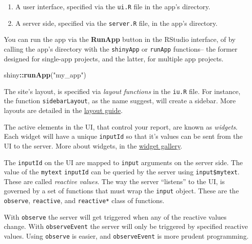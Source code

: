 \documentclass[]{book}
\newenvironment{Shaded}{\begin{snugshade}}{\end{snugshade}}
\newcommand{\KeywordTok}[1]{\textcolor[rgb]{0.13,0.29,0.53}{\textbf{#1}}}
\newcommand{\StringTok}[1]{\textcolor[rgb]{0.31,0.60,0.02}{#1}}
\newcommand{\OperatorTok}[1]{\textcolor[rgb]{0.81,0.36,0.00}{\textbf{#1}}}
\newcommand{\NormalTok}[1]{#1}
\providecommand{\tightlist}{%
  \setlength{\itemsep}{0pt}\setlength{\parskip}{0pt}}
\theoremstyle{definition}
\theoremstyle{definition}
\theoremstyle{definition}
\theoremstyle{remark}
\begin{document}
\begin{enumerate}
\def\labelenumi{\arabic{enumi}.}
\tightlist
\item
  A user interface, specified via the \texttt{ui.R} file in the app's
  directory.
\item
  A server side, specified via the \texttt{server.R} file, in the app's
  directory.
\end{enumerate}

You can run the app via the \textbf{RunApp} button in the RStudio
interface, of by calling the app's directory with the \texttt{shinyApp}
or \texttt{runApp} functions-- the former designed for single-app
projects, and the latter, for multiple app projects.

\begin{Shaded}
\begin{Highlighting}[]
\NormalTok{shiny}\OperatorTok{::}\KeywordTok{runApp}\NormalTok{(}\StringTok{"my_app"}\NormalTok{)}
\end{Highlighting}
\end{Shaded}

The site's layout, is specified via \emph{layout functions} in the
\texttt{iu.R} file. For instance, the function \texttt{sidebarLayout},
as the name suggest, will create a sidebar. More layouts are detailed in
the \href{http://shiny.rstudio.com/articles/layout-guide.html}{layout
guide}.

The active elements in the UI, that control your report, are known as
\emph{widgets}. Each widget will have a unique \texttt{inputId} so that
it's values can be sent from the UI to the server. More about widgets,
in the
\href{http://shiny.rstudio.com/gallery/widget-gallery.html}{widget
gallery}.

The \texttt{inputId} on the UI are mapped to \texttt{input} arguments on
the server side. The value of the \texttt{mytext} \texttt{inputId} can
be queried by the server using \texttt{input\$mytext}. These are called
\emph{reactive values}. The way the server ``listens'' to the UI, is
governed by a set of functions that must wrap the \texttt{input} object.
These are the \texttt{observe}, \texttt{reactive}, and
\texttt{reactive*} class of functions.

With \texttt{observe} the server will get triggered when any of the
reactive values change. With \texttt{observeEvent} the server will only
be triggered by specified reactive values. Using \texttt{observe} is
easier, and \texttt{observeEvent} is more prudent programming.
\end{document}
